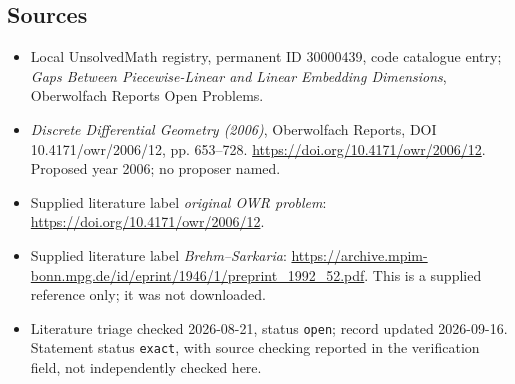 \documentclass[11pt]{article}
\begin{document}
\subsection{Sources}
\begin{itemize}\item Local UnsolvedMath registry, permanent ID 30000439, code catalogue entry; \emph{Gaps Between Piecewise-Linear and Linear Embedding Dimensions}, Oberwolfach Reports Open Problems.\item \emph{Discrete Differential Geometry (2006)}, Oberwolfach Reports, DOI 10.4171/owr/2006/12, pp. 653--728. \url{https://doi.org/10.4171/owr/2006/12}. Proposed year 2006; no proposer named.\item Supplied literature label \emph{original OWR problem}: \url{https://doi.org/10.4171/owr/2006/12}.\item Supplied literature label \emph{Brehm--Sarkaria}: \url{https://archive.mpim-bonn.mpg.de/id/eprint/1946/1/preprint_1992_52.pdf}. This is a supplied reference only; it was not downloaded.\item Literature triage checked 2026-08-21, status \texttt{open}; record updated 2026-09-16. Statement status \texttt{exact}, with source checking reported in the verification field, not independently checked here.\end{itemize}
\end{document}
